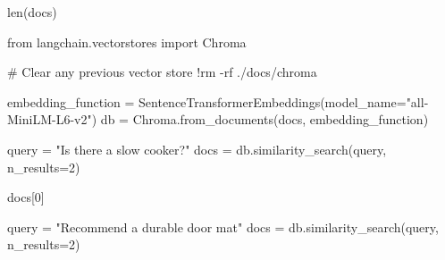 \documentclass[
  letterpaper,
  DIV=11,
  numbers=noendperiod]{scrreprt}
\newenvironment{Shaded}{\begin{snugshade}}{\end{snugshade}}
\newcommand{\BuiltInTok}[1]{\textcolor[rgb]{0.00,0.23,0.31}{#1}}
\newcommand{\CommentTok}[1]{\textcolor[rgb]{0.37,0.37,0.37}{#1}}
\newcommand{\DecValTok}[1]{\textcolor[rgb]{0.68,0.00,0.00}{#1}}
\newcommand{\ImportTok}[1]{\textcolor[rgb]{0.00,0.46,0.62}{#1}}
\newcommand{\NormalTok}[1]{\textcolor[rgb]{0.00,0.23,0.31}{#1}}
\newcommand{\OperatorTok}[1]{\textcolor[rgb]{0.37,0.37,0.37}{#1}}
\newcommand{\StringTok}[1]{\textcolor[rgb]{0.13,0.47,0.30}{#1}}
\begin{document}
\begin{Shaded}
\begin{Highlighting}[]
\BuiltInTok{len}\NormalTok{(docs)}
\end{Highlighting}
\end{Shaded}

\begin{Shaded}
\begin{Highlighting}[]
\ImportTok{from}\NormalTok{ langchain.vectorstores }\ImportTok{import}\NormalTok{ Chroma}

\CommentTok{\# Clear any previous vector store}
\OperatorTok{!}\NormalTok{rm }\OperatorTok{{-}}\NormalTok{rf .}\OperatorTok{/}\NormalTok{docs}\OperatorTok{/}\NormalTok{chroma}
\end{Highlighting}
\end{Shaded}

\begin{Shaded}
\begin{Highlighting}[]
\NormalTok{embedding\_function }\OperatorTok{=}\NormalTok{ SentenceTransformerEmbeddings(model\_name}\OperatorTok{=}\StringTok{"all{-}MiniLM{-}L6{-}v2"}\NormalTok{)}
\NormalTok{db }\OperatorTok{=}\NormalTok{ Chroma.from\_documents(docs, embedding\_function)}
\end{Highlighting}
\end{Shaded}

\begin{Shaded}
\begin{Highlighting}[]
\NormalTok{query }\OperatorTok{=} \StringTok{"Is there a slow cooker?"}
\NormalTok{docs }\OperatorTok{=}\NormalTok{ db.similarity\_search(query, n\_results}\OperatorTok{=}\DecValTok{2}\NormalTok{)}
\end{Highlighting}
\end{Shaded}

\begin{Shaded}
\begin{Highlighting}[]
\NormalTok{docs[}\DecValTok{0}\NormalTok{]}
\end{Highlighting}
\end{Shaded}

\begin{Shaded}
\begin{Highlighting}[]
\NormalTok{query }\OperatorTok{=} \StringTok{"Recommend a durable door mat"}
\NormalTok{docs }\OperatorTok{=}\NormalTok{ db.similarity\_search(query, n\_results}\OperatorTok{=}\DecValTok{2}\NormalTok{)}
\end{Highlighting}
\end{Shaded}
\end{document}
